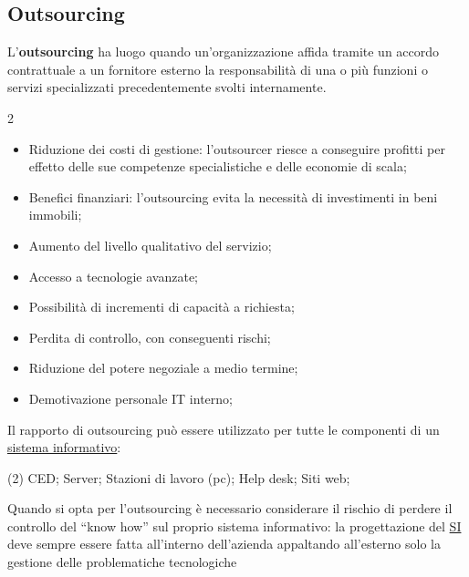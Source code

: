 \subsection{Outsourcing}\label{sub:ftt_outsourcing} %
L'\textbf{outsourcing} ha luogo quando un'organizzazione affida tramite un accordo contrattuale a un fornitore esterno la responsabilità di una o più funzioni o servizi specializzati precedentemente svolti internamente.
\begin{note}[Vantaggi]
    \begin{multicols}{2}
        \begin{itemize}
            \item Riduzione dei costi di gestione: l'outsourcer riesce a conseguire profitti per effetto delle sue competenze specialistiche e delle economie di scala;
            \item Benefici finanziari: l'outsourcing evita la necessità di investimenti in beni immobili;
            \item Aumento del livello qualitativo del servizio;
            \item Accesso a tecnologie avanzate;
            \item Possibilità di incrementi di capacità a richiesta;
        \end{itemize}
    \end{multicols}
\end{note}
\begin{warning}[Svantaggi]
    \begin{itemize}
        \item Perdita di controllo, con conseguenti rischi;
        \item Riduzione del potere negoziale a medio termine;
        \item Demotivazione personale IT interno;
    \end{itemize}
\end{warning}
Il rapporto di outsourcing può essere utilizzato per tutte le componenti di un \hyperref[sub:il_sistema_informativo]{sistema informativo}:
\begin{tasks}(2)
    \task CED;
    \task Server;
    \task Stazioni di lavoro (pc);
    \task Help desk;
    \task Siti web;
\end{tasks}
\begin{note}
    Quando si opta per l'outsourcing è necessario considerare il rischio di perdere il controllo del ``know how'' sul proprio sistema informativo: la progettazione del \hyperref[sub:il_sistema_informativo]{SI} deve sempre essere fatta all'interno dell'azienda appaltando all'esterno solo la gestione delle problematiche tecnologiche
\end{note}
%
